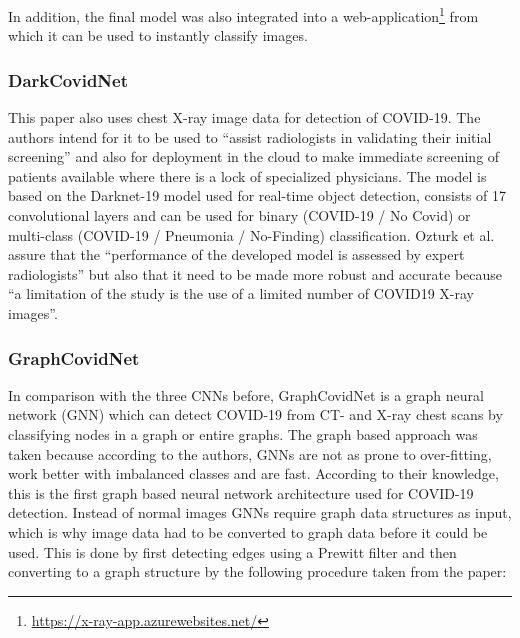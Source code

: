 In addition, the final model was also integrated into a web-application\footnote{\url{https://x-ray-app.azurewebsites.net/}} from which it can be used to instantly classify images.

\subsubsection{DarkCovidNet}
This paper also uses chest X-ray image data for detection of COVID-19. The authors intend for it to be used to \enquote{assist radiologists in validating their initial screening}\cite{dark_net} and also for deployment in the cloud to make immediate screening of patients available where there is a lock of specialized physicians. The model is based on the Darknet-19 model used for real-time object detection\cite{darknet_19}, consists of 17 convolutional layers and can be used for binary (COVID-19 / No Covid) or multi-class (COVID-19 / Pneumonia / No-Finding) classification.
Ozturk et al. assure that the \enquote{performance of the developed model is assessed by expert radiologists} but also that it need to be made more robust and accurate because \enquote{a limitation of the study is the use of a limited number of COVID19 X-ray images}\cite{dark_net}.

\subsubsection{GraphCovidNet}\label{subsubsec:methods_graphcovidnet}
In comparison with the three CNNs before, GraphCovidNet is a graph neural network (GNN) which can detect COVID-19 from CT- and X-ray chest scans by classifying nodes in a graph or entire graphs. The graph based approach was taken because according to the authors, GNNs are not as prone to over-fitting, work better with imbalanced classes and are fast\cite{graph_covid_net}. According to their knowledge, this is the first graph based neural network architecture used for COVID-19 detection.
Instead of normal images GNNs require graph data structures as input, which is why image data had to be converted to graph data before it could be used. This is done by first detecting edges using a Prewitt filter and then converting to a graph structure by the following procedure taken from the paper:

